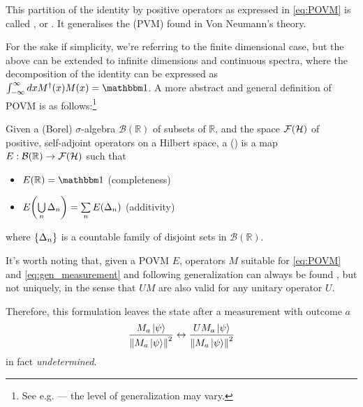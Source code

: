 This partition of the identity by positive operators
as expressed in \eqref{eq:POVM} is called
, or .
It generalises the  (PVM)
found in Von Neumann's theory.

For the sake if simplicity, we're referring to the finite dimensional case,
but the above can be extended to infinite dimensions and continuous spectra,
where the decomposition of the identity can be expressed as
$\int_{-\infty}^{\infty} dx M^{\dagger}(x)M(x) = \idop $.
A more abstract and general definition of POVM is as
follows:\footnote{
  See e.g. \cite{BeneduciPhD, Berberian} --- the level of generalization may vary.
}
\begin{definition}
  Given a (Borel) $\sigma$-algebra $\mathcal{B}(\mathbb{R})$ of subsets of $\mathbb{R}$,
  and the space $\mathcal{F}(\mathcal{H})$ of positive, self-adjoint operators on a Hilbert space,
  a  ()
  is a map $E: \mathcal{B}(\mathbb{R}) \rightarrow \mathcal{F}(\mathcal{H})$
  such that
  \begin{itemize}
    \item $E(\mathbb{R}) = \idop$ (completeness)
    \item $E\qty(\bigcup\limits_{n} \Delta_n) = \sum\limits_{n} E\qty(\Delta_n)$ (additivity) 
  \end{itemize}
  where $\left\{\Delta_n\right\}$ is a countable family of disjoint sets in
  $\mathcal{B}(\mathbb{R})$.
\end{definition}

\citereset
It's worth noting that,
given a POVM $E$, operators $M$
suitable for \eqref{eq:POVM} and \eqref{eq:gen_measurement}
and following generalization
can always be found \parencite[sec.3.1]{PreskillNotes},
but not uniquely, in the sense that
$UM$ are also valid
for any unitary operator $U$.

Therefore, this formulation leaves the state after a measurement
with outcome $a$
\[
  \frac{M_a\ket{\psi}}{\norm{M_a\ket{\psi}}^2}
  \leftrightarrow
  \frac{UM_a\ket{\psi}}{\norm{M_a\ket{\psi}}^2}
\]
in fact \emph{undetermined}.
